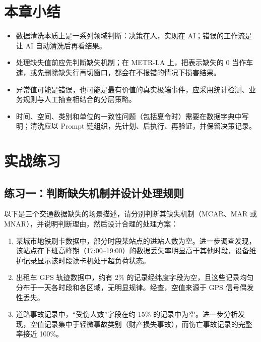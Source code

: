 \section{本章小结}

\begin{itemize}
  \item 数据清洗本质上是一系列领域判断：决策在人，实现在 AI；错误的工作流是让 AI 自动清洗后再看结果。
  \item 处理缺失值前应先判断缺失机制；在 METR-LA 上，把表示缺失的 0 当作车速，或先删除缺失行再切窗口，都会在不报错的情况下损害结果。
  \item 异常值可能是错误，也可能是最有价值的真实极端事件，应采用统计检测、业务规则与人工抽查相结合的分层策略。
  \item 时间、空间、类别和单位的一致性问题（包括夏令时）需要在数据字典中写明；清洗应以 Prompt 链组织，先计划、后执行、再验证，并保留决策记录。
\end{itemize}

\section{实战练习}

\subsection*{练习一：判断缺失机制并设计处理规则}

以下是三个交通数据缺失的场景描述，请分别判断其缺失机制（MCAR、MAR 或 MNAR），并说明判断理由，然后设计合理的处理方案：

\begin{enumerate}
  \item 某城市地铁刷卡数据中，部分时段某站点的进站人数为空。进一步调查发现，该站点在下班高峰期（17:00--19:00）的数据丢失率明显高于其他时段，设备维护记录显示该时段读卡机处于超负荷状态。
  \item 出租车 GPS 轨迹数据中，约有 2\% 的记录经纬度字段为空，且这些记录均匀分布于一天各时段和各区域，无明显规律。经查，空值来源于 GPS 信号偶发性丢失。
  \item 道路事故记录中，“受伤人数”字段在约 15\% 的记录中为空。进一步分析发现，空值记录集中于轻微事故类别（财产损失事故），而伤亡事故记录的完整率接近 100\%。
\end{enumerate}

